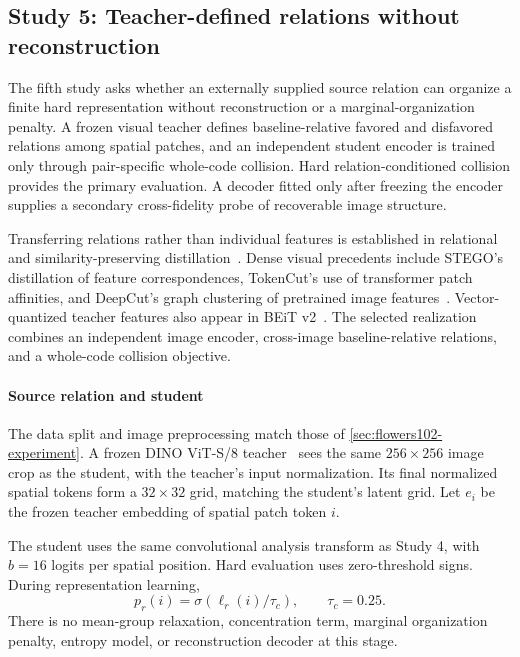 \subsection{Study 5: Teacher-defined relations without reconstruction}
\label{sec:flowers102-teacher-experiment}

The fifth study asks whether an externally supplied source relation can organize a finite hard representation without reconstruction or a marginal-organization penalty.
A frozen visual teacher defines baseline-relative favored and disfavored relations among spatial patches, and an independent student encoder is trained only through pair-specific whole-code collision.
Hard relation-conditioned collision provides the primary evaluation.
A decoder fitted only after freezing the encoder supplies a secondary cross-fidelity probe of recoverable image structure.

Transferring relations rather than individual features is established in relational and similarity-preserving distillation~\citep{park2019relational,tung2019similarity}.
Dense visual precedents include STEGO's distillation of feature correspondences, TokenCut's use of transformer patch affinities, and DeepCut's graph clustering of pretrained image features~\citep{hamilton2022unsupervised,wang2022selfsupervised,aflalo2023deepcut}.
Vector-quantized teacher features also appear in BEiT v2~\citep{peng2022beitv2}.
The selected realization combines an independent image encoder, cross-image baseline-relative relations, and a whole-code collision objective.

\paragraph{Source relation and student}
The data split and image preprocessing match those of \cref{sec:flowers102-experiment}.
A frozen DINO ViT-S/8 teacher~\citep{caron2021emerging} sees the same $256\times256$ image crop as the student, with the teacher's input normalization.
Its final normalized spatial tokens form a $32\times32$ grid, matching the student's latent grid.
Let $e_i$ be the frozen teacher embedding of spatial patch token $i$.

The student uses the same convolutional analysis transform as Study 4, with $b=16$ logits per spatial position.
Hard evaluation uses zero-threshold signs.
During representation learning,
\begin{equation}
p_r(i)=\sigma(\ell_r(i)/\tau_c),\qquad \tau_c=0.25.
\end{equation}
There is no mean-group relaxation, concentration term, marginal organization penalty, entropy model, or reconstruction decoder at this stage.


